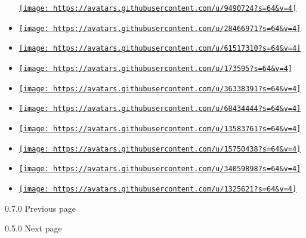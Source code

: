 \begin{itemize}
  \href{https://github.com/SUPERCILEX}{\texttt{[image: https://avatars.githubusercontent.com/u/9490724?s=64\&v=4]}}
\item
  \href{https://github.com/TomBinford}{\texttt{[image: https://avatars.githubusercontent.com/u/28466971?s=64\&v=4]}}
\item
  \href{https://github.com/abdulmelikbekmez}{\texttt{[image: https://avatars.githubusercontent.com/u/61517310?s=64\&v=4]}}
\item
  \href{https://github.com/alerque}{\texttt{[image: https://avatars.githubusercontent.com/u/173595?s=64\&v=4]}}
\item
  \href{https://github.com/chicoferreira}{\texttt{[image: https://avatars.githubusercontent.com/u/36338391?s=64\&v=4]}}
\item
  \href{https://github.com/jskherman}{\texttt{[image: https://avatars.githubusercontent.com/u/68434444?s=64\&v=4]}}
\item
  \href{https://github.com/lucifer1004}{\texttt{[image: https://avatars.githubusercontent.com/u/13583761?s=64\&v=4]}}
\item
  \href{https://github.com/raphCode}{\texttt{[image: https://avatars.githubusercontent.com/u/15750438?s=64\&v=4]}}
\item
  \href{https://github.com/thehydrogen}{\texttt{[image: https://avatars.githubusercontent.com/u/34059898?s=64\&v=4]}}
\item
  \href{https://github.com/zach-capalbo}{\texttt{[image: https://avatars.githubusercontent.com/u/1325621?s=64\&v=4]}}
\end{itemize}

\href{/docs/changelog/0.7.0/}{\pandocbounded{}}

{ 0.7.0 } { Previous page }

\href{/docs/changelog/0.5.0/}{\pandocbounded{}}

{ 0.5.0 } { Next page }
